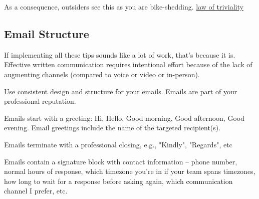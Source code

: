 As a consequence, outsiders see this as you are bike-shedding.
\href{https://en.wikipedia.org/wiki/Law_of_triviality}{law of triviality}

\subsection{Email Structure\label{sec:email-structure}}


If implementing all these tips sounds like a lot of work, that's because it is. Effective written communication requires intentional effort because of the lack of augmenting channels (compared to voice or video or in-person). 



Use consistent design and structure for your emails. Emails are part of your professional reputation.

Emails start with a greeting: Hi, Hello, Good morning, Good afternoon, Good evening. 
Email greetings include the name of the targeted recipient(s). 

Emails terminate with a professional closing, e.g., "Kindly", "Regards", etc

Emails contain a signature block with contact information -- phone number, normal hours of response, which timezone you're in if your team spans timezones, how long to wait for a response before asking again, which communication channel I prefer, etc.

